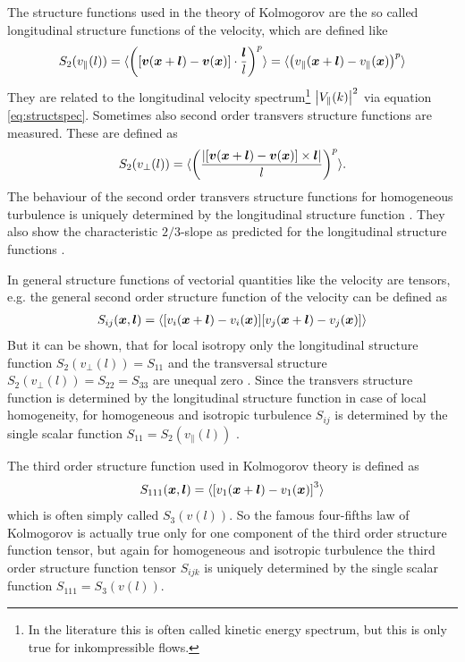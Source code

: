 The structure functions used in the theory of Kolmogorov
are the so called longitudinal structure functions of the velocity, which are
defined like
\begin{align}
S_2(v_{\parallel}(l)) =  
\langle { \left( { \left[ \boldsymbol{v}(\boldsymbol{x}+\boldsymbol{l})-\boldsymbol{v}(\boldsymbol{x}) \right] }\cdot
\frac{\boldsymbol{l}}{l} \right) }^p \rangle =
\langle { \left( v_{\parallel}(\boldsymbol{x}+\boldsymbol{l})-v_{\parallel}(\boldsymbol{x}) \right) }^p \rangle
\end{align}
They are related to the longitudinal velocity
spectrum\footnote{In the literature this is often called
kinetic energy spectrum, but this is only true for
inkompressible flows.} $\left\lvert V_{\parallel}(k)\right\rvert^2$ via equation
\eqref{eq:structspec}.
Sometimes also second order transvers structure functions are measured.
These are defined as
\begin{align}
S_2(v_{\perp}(l)) =  
\langle { \left( \frac{\left\lvert{ \left[ \boldsymbol{v}(\boldsymbol{x}+\boldsymbol{l})-\boldsymbol{v}(\boldsymbol{x}) \right] }\times
\boldsymbol{l}\right\rvert}{l} \right) }^p \rangle.
\end{align}
The behaviour of the second order transvers structure functions for
homogeneous turbulence is uniquely determined by the longitudinal structure
function \citep[p. 192, Eqs. (6.28)]{Pope2000}. They also show the
characteristic $2/3$-slope as predicted for the longitudinal structure functions
\citep[p.60]{Frisch1995}.

In general structure functions of vectorial quantities like the velocity are
tensors, e.g. the general second order structure function of the velocity can
be defined as
\begin{align}
S_{ij}(\boldsymbol{x},\boldsymbol{l}) =  
\langle { \left[ v_i(\boldsymbol{x}+\boldsymbol{l})-v_i(\boldsymbol{x}) \right] }
{ \left[ v_j(\boldsymbol{x}+\boldsymbol{l})-v_j(\boldsymbol{x}) \right] } \rangle
\end{align}
But it can be shown, that for local isotropy only the longitudinal
structure function $S_2(v_{\perp}(l))=S_{11}$ and the transversal structure
$S_2(v_{\perp}(l))=S_{22}=S_{33}$ are unequal zero \citep{Pope2000}. Since 
the transvers structure function is determined by the longitudinal structure
function in case of local homogeneity, for homogeneous and isotropic 
turbulence $S_{ij}$ is determined by the single scalar
function $S_{11} = S_2(v_{\parallel}(l))$ \citep{Pope2000}.

The third order structure function used in Kolmogorov theory is
defined as 
\begin{align}
S_{111}(\boldsymbol{x},\boldsymbol{l}) = \langle { \left[ v_1(\boldsymbol{x}+\boldsymbol{l})-v_1(\boldsymbol{x}) \right] }^3 \rangle
\end{align}
which is often simply called $S_3(v(l))$. So the famous four-fifths law of
Kolmogorov is actually true only for one component of the third order
structure function tensor, but again for homogeneous and isotropic turbulence
the third order structure function tensor $S_{ijk}$ is uniquely determined by
the single scalar function $S_{111}=S_3(v(l))$.


